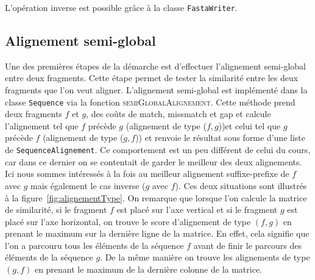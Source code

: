 L'opération inverse est possible grâce à la classe \verb|FastaWriter|.





\subsection{Alignement semi-global}
\label{subsection:semiGlobal}

Une des premières étapes de la démarche est d'effectuer l'alignement semi-global
entre deux fragments. Cette étape permet de tester la similarité entre les deux
fragments que l'on veut aligner. L'alignement semi-global est implémenté dans la
classe \verb|Sequence| via la fonction \textsc{semiGlobalAlignement}. Cette
méthode prend deux fragments $f$ et $g$, des coûts de match, missmatch et gap
et calcule l'alignement tel que $f$ précède $g$ (alignement de type ($f,g$))et celui tel que $g$ précède $f$ (alignement de type ($g,f$)) et
renvoie le résultat sous forme d'une liste de \verb|SequenceAlignement|. Ce comportement est un peu différent de celui du cours, 
car dans ce dernier on se contentait de garder le meilleur des deux alignements. Ici nous sommes intéressés à la fois  au meilleur alignement suffixe-prefixe de $f$ avec $g$ mais également le cas inverse ($g$ avec $f$). Ces deux situations sont illustrés à la figure~\ref{fig:alignementType}.
On remarque que lorsque l'on calcule la matrice de similarité, si le fragment $f$ est placé sur l'axe vertical et si le fragment $g$ est placé sur l'axe horizontal, on trouve le score d'alignement de type $(f,g)$ en prenant le maximum sur la dernière ligne de la matrice. En effet, cela signifie que l'on a parcouru tous les éléments de la séquence $f$ avant de finir le parcours des éléments de la séquence $g$. De la même manière on trouve les alignements de type $(g,f)$ en prenant le maximum de la dernière colonne de la matrice.\\

